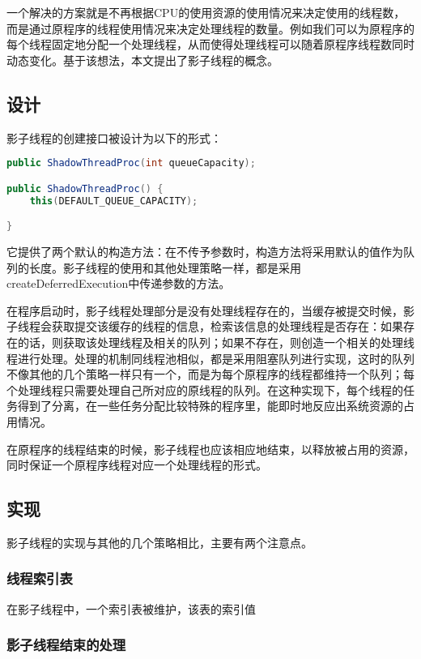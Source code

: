 一个解决的方案就是不再根据CPU的使用资源的使用情况来决定使用的线程数，而是通过原程序的线程使用情况来决定处理线程的数量。例如我们可以为原程序的每个线程固定地分配一个处理线程，从而使得处理线程可以随着原程序线程数同时动态变化。基于该想法，本文提出了影子线程的概念。

\subsection{设计}

影子线程的创建接口被设计为以下的形式：

\begin{lstlisting}[language=Java]
public ShadowThreadProc(int queueCapacity);

public ShadowThreadProc() {
	this(DEFAULT_QUEUE_CAPACITY);

}
\end{lstlisting}

它提供了两个默认的构造方法：在不传予参数时，构造方法将采用默认的值作为队列的长度。影子线程的使用和其他处理策略一样，都是采用createDeferredExecution中传递参数的方法。

在程序启动时，影子线程处理部分是没有处理线程存在的，当缓存被提交时候，影子线程会获取提交该缓存的线程的信息，检索该信息的处理线程是否存在：如果存在的话，则获取该处理线程及相关的队列；如果不存在，则创造一个相关的处理线程进行处理。处理的机制同线程池相似，都是采用阻塞队列进行实现，这时的队列不像其他的几个策略一样只有一个，而是为每个原程序的线程都维持一个队列；每个处理线程只需要处理自己所对应的原线程的队列。在这种实现下，每个线程的任务得到了分离，在一些任务分配比较特殊的程序里，能即时地反应出系统资源的占用情况。

在原程序的线程结束的时候，影子线程也应该相应地结束，以释放被占用的资源，同时保证一个原程序线程对应一个处理线程的形式。

\subsection{实现}

影子线程的实现与其他的几个策略相比，主要有两个注意点。

\subsubsection{线程索引表}

在影子线程中，一个索引表被维护，该表的索引值

\subsubsection{影子线程结束的处理}
